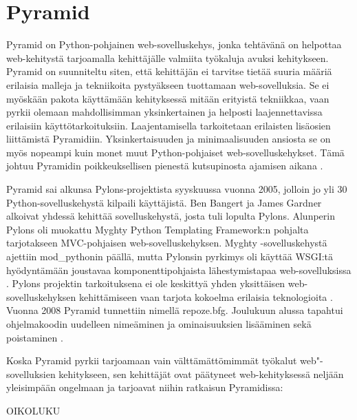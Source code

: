 \documentclass[utf8]{gradu3}
\begin{document}
\section{Pyramid}
Pyramid on Python-pohjainen web-sovelluskehys, jonka tehtävänä on helpottaa web-kehitystä tarjoamalla
kehittäjälle valmiita työkaluja avuksi kehitykseen. Pyramid on suunniteltu siten, että kehittäjän ei tarvitse tietää suuria määriä erilaisia malleja ja tekniikoita pystyäkseen tuottamaan web-sovelluksia. Se ei myöskään pakota käyttämään kehityksessä mitään erityistä tekniikkaa, vaan pyrkii olemaan mahdollisimman yksinkertainen ja helposti laajennettavissa erilaisiin käyttötarkoituksiin. Laajentamisella tarkoitetaan erilaisten lisäosien liittämistä Pyramidiin. Yksinkertaisuuden ja minimaalisuuden ansiosta se on myös nopeampi kuin monet muut Python-pohjaiset web-sovelluskehykset. Tämä johtuu Pyramidin poikkeuksellisen pienestä kutsupinosta ajamisen aikana \parencite{pyramid_intr}. 

Pyramid sai alkunsa Pylons-projektista syyskuussa vuonna 2005, jolloin jo yli 30 Python-sovelluskehystä kilpaili käyttäjistä. Ben Bangert ja James Gardner alkoivat yhdessä kehittää sovelluskehystä, josta tuli lopulta Pylons. Alunperin Pylons oli
muokattu Myghty Python Templating Framework:n pohjalta tarjotakseen MVC-pohjaisen web-sovelluskehyksen. Myghty -sovelluskehystä ajettiin mod\_pythonin päällä, mutta Pylonsin pyrkimys oli käyttää WSGI:tä hyödyntämään joustavaa komponenttipohjaista lähestymistapaa web-sovelluksissa \parencite{pylons_history}. Pylons projektin tarkoituksena ei ole keskittyä yhden yksittäisen web-sovelluskehyksen kehittämiseen vaan tarjota kokoelma erilaisia teknologioita \parencite{pylons_about}. Vuonna 2008 Pyramid tunnettiin nimellä repoze.bfg. Joulukuun alussa tapahtui ohjelmakoodin uudelleen nimeäminen ja ominaisuuksien lisääminen sekä poistaminen \parencite{pyramid_about}.

Koska Pyramid pyrkii tarjoamaan vain välttämättömimmät työkalut web"-sovelluksien kehitykseen, sen kehittäjät
ovat päätyneet web-kehityksessä neljään yleisimpään ongelmaan ja tarjoavat niihin ratkaisun Pyramidissa:

OIKOLUKU
\end{document}
